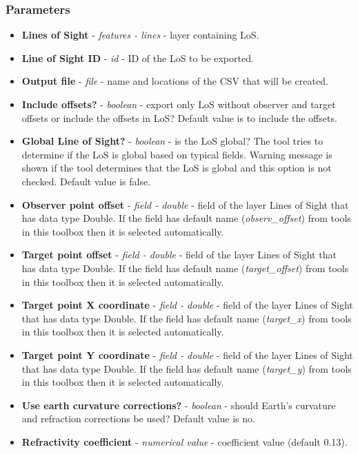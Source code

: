 \documentclass[]{article}
\begin{document}
\subsubsection{Parameters}
\begin{itemize}
	\item \textbf{Lines of Sight} - \textit{features - lines} - layer containing LoS.
	\item \textbf{Line of Sight ID} - \textit{id} - ID of the LoS to be exported.
	\item \textbf{Output file} - \textit{file} - name and locations of the CSV that will be created.
	\item \textbf{Include offsets?} -  \textit{boolean} - export only LoS without observer and target offsets or include the offsets in LoS? Default value is to include the offsets.
	\item \textbf{Global Line of Sight?} - \textit{boolean} - is the LoS global? The tool tries to determine if the LoS is global based on typical fields. Warning message is shown if the tool determines that the LoS is global and this option is not checked. Default value is false.
	\item \textbf{Observer point offset} - \textit{field - double} - field of the layer Lines of Sight that has data type Double. If the field has default name (\textit{observ\_offset}) from tools in this toolbox then it is selected automatically.
	\item \textbf{Target point offset} - \textit{field - double} - field of the layer Lines of Sight that has data type Double. If the field has default name (\textit{target\_offset}) from tools in this toolbox then it is selected automatically.
	\item \textbf{Target point X coordinate} - \textit{field - double} - field of the layer Lines of Sight that has data type Double. If the field has default name (\textit{target\_x}) from tools in this toolbox then it is selected automatically.
	\item \textbf{Target point Y coordinate} - \textit{field - double} - field of the layer Lines of Sight that has data type Double. If the field has default name (\textit{target\_y}) from tools in this toolbox then it is selected automatically.
	\item \textbf{Use earth curvature corrections?} - \textit{boolean} - should Earth's curvature and refraction corrections be used? Default value is no.
	\item \textbf{Refractivity coefficient} - \textit{numerical value}  - coefficient value (default 0.13).
\end{itemize}
\end{document}
